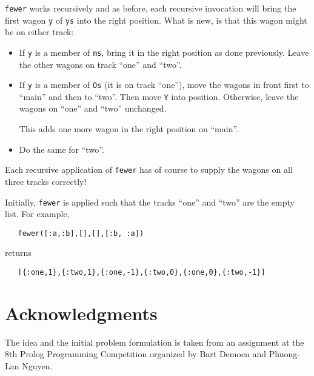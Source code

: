 \documentclass[a4paper,11pt]{article}
\begin{document}
\verb+fewer+ works recursively and as before, each recursive
invocation will bring the first wagon \verb+y+ of \verb+ys+ into the right
position. What is new, is that this wagon might be on either
track:
\begin{itemize}
\item If \verb+y+ is a member of \verb+ms+, bring it in the right
  position as done previously. Leave the other wagons on track
  ``one'' and ``two''.
\item If \verb+y+ is a member of \verb+Os+ (it is on track ``one''), move
  the wagons in front first to ``main'' and then to ``two''. Then
  move \verb+Y+ into position. Otherwise, leave the wagons on ``one''
  and ``two'' unchanged.

  This adds one more wagon in the right position on ``main''.
\item Do the same for ``two''.
\end{itemize}

Each recursive application of \verb+fewer+ has of course to
supply the wagons on all three tracks correctly!

Initially, \verb+fewer+ is applied such that the tracks ``one''
and ``two'' are the empty list. For example,
\begin{verbatim}
   fewer([:a,:b],[],[],[:b, :a])
\end{verbatim}
returns
\begin{verbatim}
   [{:one,1},{:two,1},{:one,-1},{:two,0},{:one,0},{:two,-1}]
\end{verbatim}

\section{Acknowledgments}

The idea and the initial problem formulation is taken from an
assignment at the 8th Prolog Programming Competition organized by Bart
Demoen and Phuong-Lan Nguyen. 
\end{document}
